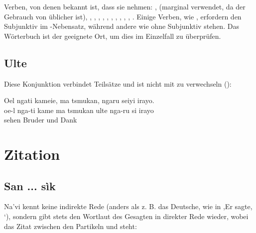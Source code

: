 \subsubsection{} Verben, von denen bekannt ist, dass sie  nehmen: ,  (marginal verwendet, da der Gebrauch von  üblicher ist), , , , , , , , , , , . Einige Verben, wie  , erfordern den Subjunktiv im -Nebensatz, während andere wie   ohne Subjunktiv stehen. Das Wörterbuch ist der geeignete Ort, um dies im Einzelfall zu überprüfen.

\subsection{Ulte} Diese Konjunktion verbindet Teilsätze und ist nicht mit  zu verwechseln  ():\label{syn:ulte}

\begin{interlin}
	\glll Oel ngati kameie, ma tsmukan,  ngaru seiyi irayo. \\
	oe-l nga-ti kame ma tsmukan ulte nga-ru si irayo \\
	  sehen  Bruder und   Dank \\
\end{interlin}

\section{Zitation}
\label{syn:direct-quote}

\subsection{San ... sìk} Na'vi kennt keine indirekte Rede (anders als z. B. das Deutsche, wie in ,Er sagte, ‘), sondern gibt stets den Wortlaut des Gesagten in direkter Rede wieder, wobei das Zitat zwischen den Partikeln  und  steht: 

